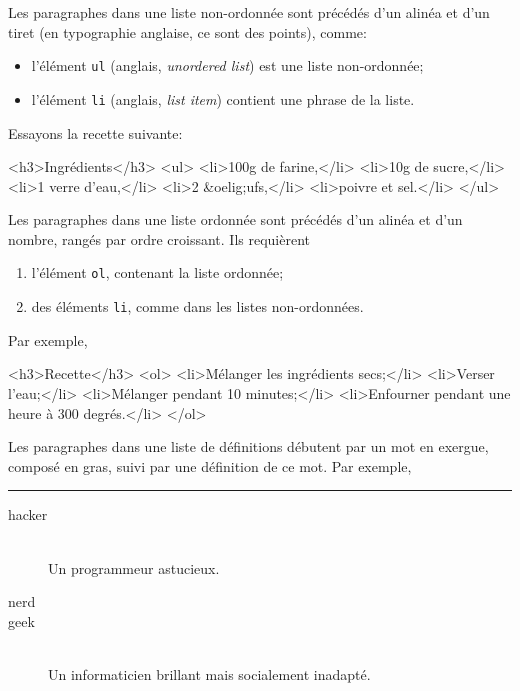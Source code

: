 Les paragraphes dans une liste non-ordonnée sont précédés d'un alinéa
et d'un tiret (en typographie anglaise, ce sont des points), comme:
\begin{itemize}

  \item l'élément \texttt{ul} (anglais, \emph{unordered list}) est
  une liste non-ordonnée;

  \item l'élément \texttt{li} (anglais, \emph{list item}) contient une
    phrase de la liste.

\end{itemize}
Essayons la recette suivante:
\begin{sverb}
<h3>Ingrédients</h3>
<ul>
  <li>100g de farine,</li>
  <li>10g de sucre,</li>
  <li>1 verre d'eau,</li>
  <li>2 &oelig;ufs,</li>
  <li>poivre et sel.</li>
</ul>
\end{sverb}
Les paragraphes dans une liste ordonnée sont précédés d'un alinéa et
d'un nombre, rangés par ordre croissant. Ils requièrent
\begin{enumerate}

  \item l'élément \texttt{ol}, contenant la liste ordonnée;

  \item des éléments \texttt{li}, comme dans les listes non-ordonnées.

\end{enumerate}
Par exemple,
\begin{sverb}
<h3>Recette</h3>
<ol>
  <li>Mélanger les ingrédients secs;</li>
  <li>Verser l'eau;</li>
  <li>Mélanger pendant 10 minutes;</li>
  <li>Enfourner pendant une heure à 300 degrés.</li>
</ol>
\end{sverb}
Les paragraphes dans une liste de définitions débutent par un mot en
exergue, composé en gras, suivi par une définition de ce mot. Par
exemple,
\noindent\rule{\linewidth}{0.5pt}
\begin{description}

  \item[hacker]\ \\
    Un programmeur astucieux.

  \item[nerd]

  \item[geek]\ \\
    Un informaticien brillant mais socialement inadapté.

\end{description}
